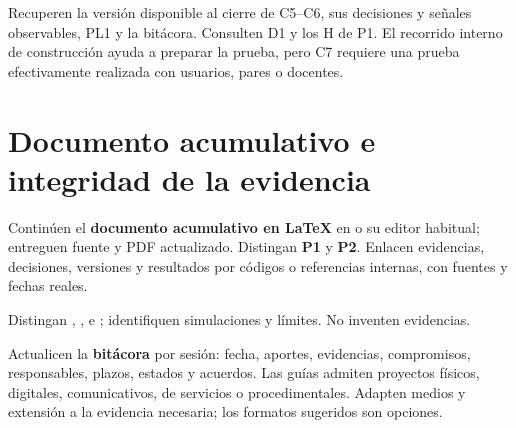 Recuperen la versión disponible al cierre de C5--C6, sus decisiones y señales observables, PL1 y la bitácora. Consulten D1 y los H de P1. El recorrido interno de construcción ayuda a preparar la prueba, pero C7 requiere una prueba efectivamente realizada con usuarios, pares o docentes.

\section*{Documento acumulativo e integridad de la evidencia}
Continúen el \textbf{documento acumulativo en LaTeX} en  o su editor habitual; entreguen fuente y PDF actualizado. Distingan \textbf{P1} y \textbf{P2}. Enlacen evidencias, decisiones, versiones y resultados por códigos o referencias internas, con fuentes y fechas reales.

Distingan , ,  e ; identifiquen simulaciones y límites.  No inventen evidencias.

Actualicen la \textbf{bitácora} por sesión: fecha, aportes, evidencias, compromisos, responsables, plazos, estados y acuerdos. Las guías admiten proyectos físicos, digitales, comunicativos, de servicios o procedimentales. Adapten medios y extensión a la evidencia necesaria; los formatos sugeridos son opciones.

